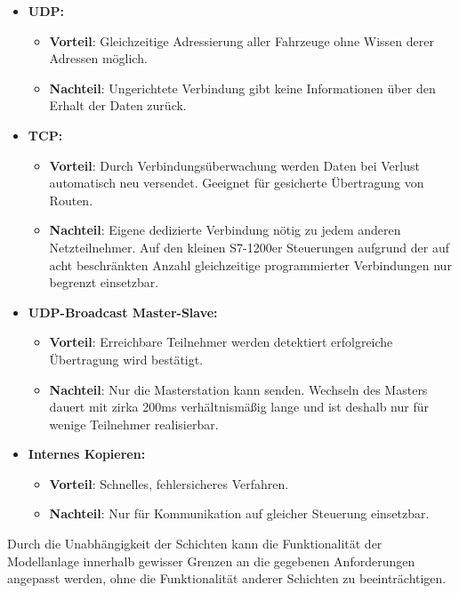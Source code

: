 		\begin{itemize}
			\item \textbf{\ac{UDP}:} 
				\begin{itemize}
					\item \textbf{Vorteil}: Gleichzeitige Adressierung aller Fahrzeuge ohne Wissen derer Adressen möglich.
					\item \textbf{Nachteil}: Ungerichtete Verbindung gibt keine Informationen über den Erhalt der Daten zurück.
				\end{itemize}
			\item \textbf{\acs{TCP}:}
				\begin{itemize}
					\item \textbf{Vorteil}: Durch Verbindungsüberwachung werden Daten bei Verlust automatisch neu versendet. Geeignet für gesicherte Übertragung von Routen.
					\item \textbf{Nachteil}: Eigene dedizierte Verbindung nötig zu jedem anderen Netzteilnehmer. Auf den kleinen S7-1200er Steuerungen aufgrund der auf acht beschränkten Anzahl gleichzeitige programmierter Verbindungen\cite{S7-1200} nur begrenzt einsetzbar.
				\end{itemize}
			\item \textbf{\ac{UDP}-Broadcast Master-Slave:}
				\begin{itemize}
					\item \textbf{Vorteil}: Erreichbare Teilnehmer werden detektiert erfolgreiche Übertragung wird bestätigt.
					\item \textbf{Nachteil}: Nur die Masterstation kann senden. Wechseln des Masters dauert mit zirka 200ms verhältnismäßig lange und ist deshalb nur für wenige Teilnehmer realisierbar. 
				\end{itemize}
			\item \textbf{Internes Kopieren:}
			\begin{itemize}
				\item \textbf{Vorteil}: Schnelles, fehlersicheres Verfahren.
				\item \textbf{Nachteil}: Nur für Kommunikation auf gleicher Steuerung einsetzbar.
			\end{itemize}
		\end{itemize}
		
		Durch die Unabhängigkeit der Schichten kann die Funktionalität der Modellanlage innerhalb gewisser Grenzen an die gegebenen Anforderungen angepasst werden, ohne die Funktionalität anderer Schichten zu beeinträchtigen.

